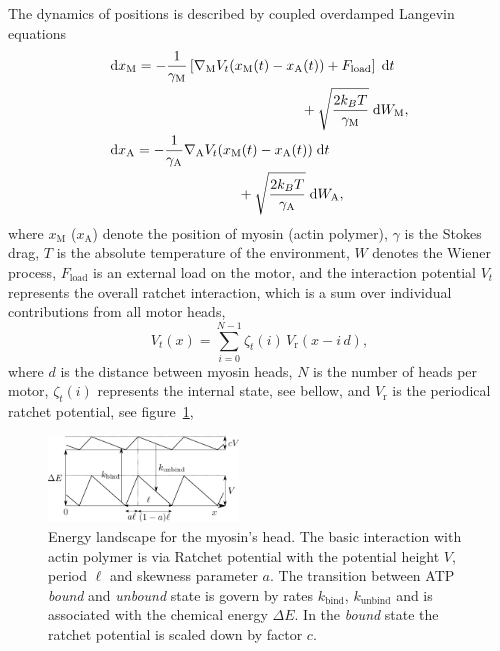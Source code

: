 \documentclass[aps,pre,twocolumn,showpacs,showkeys,superscriptaddress,floatfix]{revtex4-1}
\newcommand{\rmd}{{\mathrm d}}
\begin{document}
The dynamics of positions is described by coupled overdamped Langevin equations 
\begin{align}
&\begin{multlined}[b]
\rmd x_\text{M} = 
- \frac{1}{\gamma_\text{M}} \left[ \nabla_\text{M} V_t(x_\text{M}(t) - x_\text{A}(t)) + F_\text{load} \right] \; \rmd t 
\\ 
+ \sqrt{ \frac{2 k_B T}{\gamma_\text{M}} } \; \rmd W_\text{M} ,
\end{multlined}
\label{eq:eom_M} \\
&\begin{multlined}[b][.42\textwidth]
\rmd x_\text{A} = 
- \frac{1}{\gamma_\text{A}} \nabla_\text{A} V_t(x_\text{M}(t) - x_\text{A}(t)) \; \rmd t 
\\
+ \sqrt{ \frac{2 k_B T}{\gamma_\text{A}} } \; \rmd W_\text{A} ,
\end{multlined}
\label{eq:eom_A}
\end{align}
where $x_\text{M}$ ($x_\text{A}$) denote the position of myosin (actin polymer), 
$\gamma$ is the Stokes drag,
$T$ is the absolute temperature of the environment,
$W$ denotes the Wiener process,
$F_\text{load}$ is an external load on the motor, 
and the interaction potential $V_t$ represents the overall ratchet interaction, which is a sum over individual contributions from all motor heads,
\begin{equation}
V_t(x) = \sum\limits_{i=0}^{N-1} \zeta_t(i) \, V_\text{r} (x - i \, d ), 
\label{eq:ratchet_interaction}
\end{equation}
where $d$ is the distance between myosin heads, 
$N$ is the number of heads per motor,
$\zeta_t(i)$ represents the internal state, see bellow, 
and $V_\text{r}$ is the periodical ratchet potential, see figure~\ref{fig:energy},
\begin{figure}[t]
\centering
\includegraphics[width=0.45\textwidth,height=!]{energy}
\caption{
\label{fig:energy}
Energy landscape for the myosin's head.
The basic interaction with actin polymer is via Ratchet potential with the potential height $V$, period $\ell$ and skewness parameter $a$.
The transition between ATP \emph{bound} and \emph{unbound} state is govern by rates $k_\text{bind}$, $k_\text{unbind}$ 
and is associated with the chemical energy $\Delta E$.
In the \emph{bound} state the ratchet potential is scaled down by factor $c$. 
}
\end{figure}
\end{document}
